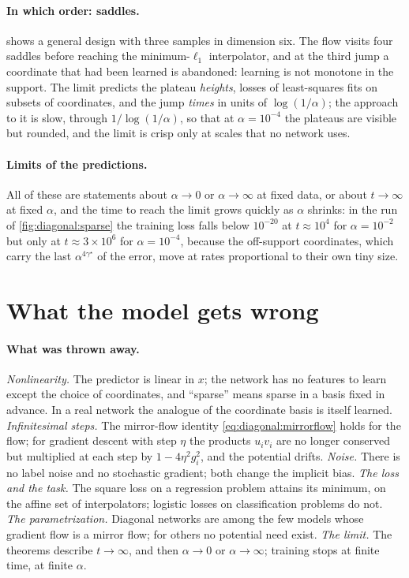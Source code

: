 \begin{refsection}
\paragraph{In which order: saddles.}  shows a general design with three samples in dimension six. The flow visits four saddles before reaching the minimum-$\ell_1$ interpolator, and at the third jump a coordinate that had been learned is abandoned: learning is not monotone in the support. The limit predicts the plateau \emph{heights}, losses of least-squares fits on subsets of coordinates, and the jump \emph{times} in units of $\log(1/\alpha)$; the approach to it is slow, through $1/\log(1/\alpha)$, so that at $\alpha=10^{-4}$ the plateaus are visible but rounded, and the limit is crisp only at scales that no network uses.

\paragraph{Limits of the predictions.} All of these are statements about $\alpha\to0$ or $\alpha\to\infty$ at fixed data, or about $t\to\infty$ at fixed $\alpha$, and the time to reach the limit grows quickly as $\alpha$ shrinks: in the run of \cref{fig:diagonal:sparse} the training loss falls below $10^{-20}$ at $t\approx10^4$ for $\alpha=10^{-2}$ but only at $t\approx3\times10^6$ for $\alpha=10^{-4}$, because the off-support coordinates, which carry the last $\alpha^{4\gamma^\star}$ of the error, move at rates proportional to their own tiny size.

\section{What the model gets wrong}\label{sec:diagonal:wrong}

\paragraph{What was thrown away.} \emph{Nonlinearity.} The predictor is linear in $x$; the network has no features to learn except the choice of coordinates, and ``sparse'' means sparse in a basis fixed in advance. In a real network the analogue of the coordinate basis is itself learned. \emph{Infinitesimal steps.} The mirror-flow identity \eqref{eq:diagonal:mirrorflow} holds for the flow; for gradient descent with step $\eta$ the products $u_iv_i$ are no longer conserved but multiplied at each step by $1-4\eta^2g_i^2$, and the potential drifts. \emph{Noise.} There is no label noise and no stochastic gradient; both change the implicit bias. \emph{The loss and the task.} The square loss on a regression problem attains its minimum, on the affine set of interpolators; logistic losses on classification problems do not. \emph{The parametrization.} Diagonal networks are among the few models whose gradient flow is a mirror flow; for others no potential need exist. \emph{The limit.} The theorems describe $t\to\infty$, and then $\alpha\to0$ or $\alpha\to\infty$; training stops at finite time, at finite $\alpha$.


\end{refsection}
